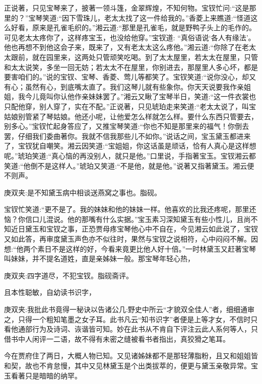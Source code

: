 \begin{parag}
    正说著，只见宝琴来了，披著一领斗篷，金翠辉煌，不知何物。宝钗忙问:“这是那里的？”宝琴笑道:“因下雪珠儿，老太太找了这一件给我的。”香菱上来瞧道:“怪道这么好看，原来是孔雀毛织的。”湘云道:“那里是孔雀毛，就是野鸭子头上的毛作的。可见老太太疼你了，这样疼宝玉，也没给他穿。”宝钗道: “真俗语说‘各人有缘法’。他也再想不到他这会子来，既来了，又有老太太这么疼他。”湘云道:“你除了在老太太跟前，就在园里来，这两处只管顽笑吃喝。到了太太屋里，若太太在屋里，只管和太太说笑，多坐一回无妨；若太太不在屋里，你别进去，那屋里人多心坏，都是要害咱们的。”说的宝钗、宝琴、香菱、莺儿等都笑了。宝钗笑道:“说你没心，却又有心；虽然有心，到底嘴太直了。我们这琴儿就有些象你。你天天说要我作亲姐姐，我今儿竟叫你认他作亲妹妹罢了。”湘云又瞅了宝琴半日，笑道:“这一件衣裳也只配他穿，别人穿了，实在不配。”正说著，只见琥珀走来笑道:“老太太说了，叫宝姑娘别管紧了琴姑娘。他还小呢，让他爱怎么样就怎么样。要什么东西只管要去，别多心。”宝钗忙起身答应了，又推宝琴笑道:“你也不知是那里来的福气！你倒去罢，仔细我们委曲著你。我就不信我那些儿不如你。”说话之间，宝玉黛玉都进来了，宝钗犹自嘲笑。湘云因笑道:“宝姐姐，你这话虽是顽话，恰有人真心是这样想呢。”琥珀笑道:“真心恼的再没别人，就只是他。”口里说，手指著宝玉。宝钗湘云都笑道:“他倒不是这样人。”琥珀又笑道:“不是他，就是他。”说著又指著黛玉。湘云便不则声。\begin{note}庚双夹:是不知黛玉病中相谈送燕窝之事也。脂砚。\end{note}宝钗忙笑道:“更不是了。我的妹妹和他的妹妹一样。他喜欢的比我还疼呢，那里还恼？你信口儿混说。他的那嘴有什么实据。”宝玉素习深知黛玉有些小性儿，且尚不知近日黛玉和宝钗之事，正恐贾母疼宝琴他心中不自在，今见湘云如此说了，宝钗又如此答，再审度黛玉声色亦不似往时，果然与宝钗之说相符，心中闷闷不解。因想:“他两个素日不是这样的好，今看来竟更比他人好十倍。”一时林黛玉又赶著宝琴叫妹妹，并不提名道姓，直是亲姊妹一般。那宝琴年轻心热，\begin{note}庚双夹:四字道尽，不犯宝钗。脂砚斋评。\end{note}且本性聪敏，自幼读书识字，\begin{note}庚双夹:我批此书竟得一秘诀以告诸公几:野史中所云“才貌双全佳人”者，细细通审之，只得一个粗知笔墨之女子耳。此书凡云“知书识字”者便是上等才女，不信时只看他通部行为及诗词、诙谐皆可知。妙在此书从不肯自下评注云此人系何等人，只借书中人闲评一二语，故不得有未密之缝被看书者指出，真狡猾之笔耳。\end{note}今在贾府住了两日，大概人物已知。又见诸姊妹都不是那轻薄脂粉，且又和姐姐皆和契，故也不肯怠慢，其中又见林黛玉是个出类拔萃的，便更与黛玉亲敬异常。宝玉看著只是暗暗的纳罕。
\end{parag}


